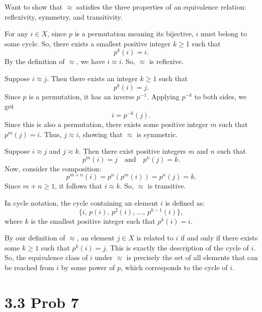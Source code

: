 \documentclass{report}
\begin{document}
\begin{proofWithHibiscus}
  Want to show that \( \approx \) satisfies the three properties of an equivalence relation: reflexivity, symmetry, and transitivity.

  \medskip
    
  For any \( i \in X \), since \( p \) is a permutation meaning its bijective, \( i \) must belong to some cycle. So, there exists a smallest positive integer \( k \geq 1 \) such that
  \[ p^k(i) = i. \]
  By the definition of \( \approx \), we have \( i \approx i \). So, \( \approx \) is reflexive.
  
  \medskip

  Suppose \( i \approx j \). Then there exists an integer \( k \geq 1 \) such that
  \[ p^k(i) = j. \]
  Since \( p \) is a permutation, it has an inverse \( p^{-1} \). Applying \( p^{-k} \) to both sides, we get
  \[ i = p^{-k}(j). \]
  Since this is also a permutation, there exists some positive integer \( m \) such that \( p^m(j) = i \). Thus, \( j \approx i \), showing that \( \approx \) is symmetric.
  
  \medskip 

  Suppose \( i \approx j \) and \( j \approx k \). Then there exist positive integers \( m \) and \( n \) such that
  \[ p^m(i) = j \quad \text{and} \quad p^n(j) = k. \]
  Now, consider the composition:
  \[ p^{m+n}(i) = p^n(p^m(i)) = p^n(j) = k. \]
  Since \( m+n \geq 1 \), it follows that \( i \approx k \). So, \( \approx \) is transitive.
  
  \bigskip   

  In cycle notation, the cycle containing an element \( i \) is defined as:
  \[\{ i,\, p(i),\, p^2(i),\, \ldots,\, p^{k-1}(i) \}, \]
  where \( k \) is the smallest positive integer such that \( p^k(i) = i \). 

  \bigskip
  
  By our definition of \( \approx \), an element \( j \in X \) is related to \( i \) if and only if there exists some \( k \geq 1 \) such that \( p^k(i) = j \). 
  This is exactly the description of the cycle of \( i \). So, the equivalence 
  class of \( i \) under \( \approx \) is precisely the set of all elements that 
  can be reached from \( i \) by some power of \( p \), which corresponds to the 
  cycle of \( i \).
    
\end{proofWithHibiscus}

\section*{3.3 Prob 7}
\end{document}
